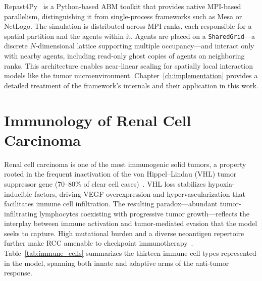 Repast4Py~\cite{collier2020} is a Python-based ABM toolkit that provides native MPI-based parallelism, distinguishing it from single-process frameworks such as Mesa or NetLogo. The simulation is distributed across MPI ranks, each responsible for a spatial partition and the agents within it. Agents are placed on a \texttt{SharedGrid}---a discrete $N$-dimensional lattice supporting multiple occupancy---and interact only with nearby agents, including read-only ghost copies of agents on neighboring ranks. This architecture enables near-linear scaling for spatially local interaction models like the tumor microenvironment. Chapter~\ref{ch:implementation} provides a detailed treatment of the framework's internals and their application in this work.

\section{Immunology of Renal Cell Carcinoma}
\label{sec:bg_immunology}

Renal cell carcinoma is one of the most immunogenic solid tumors, a property rooted in the frequent inactivation of the von Hippel--Lindau (VHL) tumor suppressor gene (70--80\% of clear cell cases)~\cite{gnarra1994}. VHL loss stabilizes hypoxia-inducible factors, driving VEGF overexpression and hypervascularization that facilitates immune cell infiltration. The resulting paradox---abundant tumor-infiltrating lymphocytes coexisting with progressive tumor growth---reflects the interplay between immune activation and tumor-mediated evasion that the model seeks to capture. High mutational burden and a diverse neoantigen repertoire further make RCC amenable to checkpoint immunotherapy~\cite{Motzer2015}. Table~\ref{tab:immune_cells} summarizes the thirteen immune cell types represented in the model, spanning both innate and adaptive arms of the anti-tumor response.

